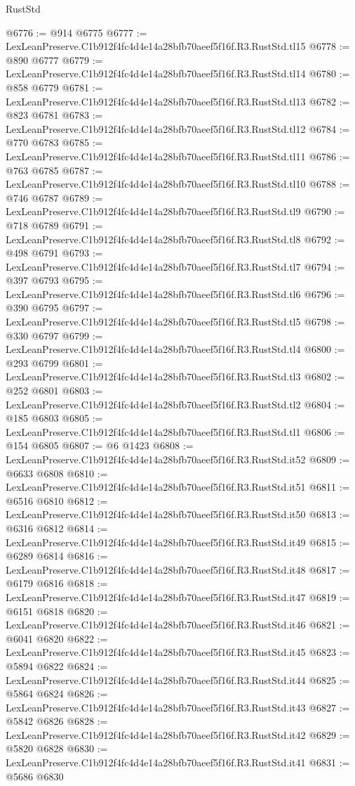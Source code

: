 \begin{lexlean}{RustStd}
\begin{coremodule}
@6776 := @914 @6775
@6777 := LexLeanPreserve.C1b912f4fc4d4e14a28bfb70aeef5f16f.R3.RustStd.tl15
@6778 := @890 @6777
@6779 := LexLeanPreserve.C1b912f4fc4d4e14a28bfb70aeef5f16f.R3.RustStd.tl14
@6780 := @858 @6779
@6781 := LexLeanPreserve.C1b912f4fc4d4e14a28bfb70aeef5f16f.R3.RustStd.tl13
@6782 := @823 @6781
@6783 := LexLeanPreserve.C1b912f4fc4d4e14a28bfb70aeef5f16f.R3.RustStd.tl12
@6784 := @770 @6783
@6785 := LexLeanPreserve.C1b912f4fc4d4e14a28bfb70aeef5f16f.R3.RustStd.tl11
@6786 := @763 @6785
@6787 := LexLeanPreserve.C1b912f4fc4d4e14a28bfb70aeef5f16f.R3.RustStd.tl10
@6788 := @746 @6787
@6789 := LexLeanPreserve.C1b912f4fc4d4e14a28bfb70aeef5f16f.R3.RustStd.tl9
@6790 := @718 @6789
@6791 := LexLeanPreserve.C1b912f4fc4d4e14a28bfb70aeef5f16f.R3.RustStd.tl8
@6792 := @498 @6791
@6793 := LexLeanPreserve.C1b912f4fc4d4e14a28bfb70aeef5f16f.R3.RustStd.tl7
@6794 := @397 @6793
@6795 := LexLeanPreserve.C1b912f4fc4d4e14a28bfb70aeef5f16f.R3.RustStd.tl6
@6796 := @390 @6795
@6797 := LexLeanPreserve.C1b912f4fc4d4e14a28bfb70aeef5f16f.R3.RustStd.tl5
@6798 := @330 @6797
@6799 := LexLeanPreserve.C1b912f4fc4d4e14a28bfb70aeef5f16f.R3.RustStd.tl4
@6800 := @293 @6799
@6801 := LexLeanPreserve.C1b912f4fc4d4e14a28bfb70aeef5f16f.R3.RustStd.tl3
@6802 := @252 @6801
@6803 := LexLeanPreserve.C1b912f4fc4d4e14a28bfb70aeef5f16f.R3.RustStd.tl2
@6804 := @185 @6803
@6805 := LexLeanPreserve.C1b912f4fc4d4e14a28bfb70aeef5f16f.R3.RustStd.tl1
@6806 := @154 @6805
@6807 := @6 @1423
@6808 := LexLeanPreserve.C1b912f4fc4d4e14a28bfb70aeef5f16f.R3.RustStd.it52
@6809 := @6633 @6808
@6810 := LexLeanPreserve.C1b912f4fc4d4e14a28bfb70aeef5f16f.R3.RustStd.it51
@6811 := @6516 @6810
@6812 := LexLeanPreserve.C1b912f4fc4d4e14a28bfb70aeef5f16f.R3.RustStd.it50
@6813 := @6316 @6812
@6814 := LexLeanPreserve.C1b912f4fc4d4e14a28bfb70aeef5f16f.R3.RustStd.it49
@6815 := @6289 @6814
@6816 := LexLeanPreserve.C1b912f4fc4d4e14a28bfb70aeef5f16f.R3.RustStd.it48
@6817 := @6179 @6816
@6818 := LexLeanPreserve.C1b912f4fc4d4e14a28bfb70aeef5f16f.R3.RustStd.it47
@6819 := @6151 @6818
@6820 := LexLeanPreserve.C1b912f4fc4d4e14a28bfb70aeef5f16f.R3.RustStd.it46
@6821 := @6041 @6820
@6822 := LexLeanPreserve.C1b912f4fc4d4e14a28bfb70aeef5f16f.R3.RustStd.it45
@6823 := @5894 @6822
@6824 := LexLeanPreserve.C1b912f4fc4d4e14a28bfb70aeef5f16f.R3.RustStd.it44
@6825 := @5864 @6824
@6826 := LexLeanPreserve.C1b912f4fc4d4e14a28bfb70aeef5f16f.R3.RustStd.it43
@6827 := @5842 @6826
@6828 := LexLeanPreserve.C1b912f4fc4d4e14a28bfb70aeef5f16f.R3.RustStd.it42
@6829 := @5820 @6828
@6830 := LexLeanPreserve.C1b912f4fc4d4e14a28bfb70aeef5f16f.R3.RustStd.it41
@6831 := @5686 @6830

\end{coremodule}
\end{lexlean}
